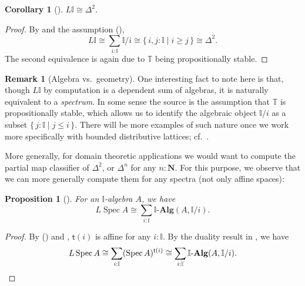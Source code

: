 \documentclass[a4paper,12pt]{amsart}
\newtheorem{corollary}[theorem]{Corollary}
\newtheorem{proposition}[theorem]{Proposition}
\theoremstyle{definition}
\newtheorem{remark}[theorem]{Remark}
\newtheorem*{axiom}{Axiom}
\newcommand{\mb}[1]{\mathbf{#1}}
\newcommand{\mbb}[1]{\mathbb{#1}}
\newcommand{\T}{\mbb T}
\newcommand{\I}{\mbb I}
\newcommand{\ms}[1]{\mathsf{#1}}
\newcommand{\alg}{\text{-}\mb{Alg}}
\newcommand{\scomp}[2]{\{\,#1\mid#2\,\}}
\newcommand{\N}{\mb N}
\newcommand{\spec}{\operatorname{Spec}}
\newcommand\istsym{\ms{t}}
\newcommand\ist[1]{\istsym(#1)}
\begin{document}
\begin{corollary}[\AxiomSQCI]
  $L \I \cong \Delta^2$.
\end{corollary}
\begin{proof}
  By  and the assumption (\AxiomSQCI),
  \[ L\I \cong \sum_{i:\I}\I/i \cong \scomp{i,j : \I}{i \ge j} \cong \Delta^2\text{.} \]
  The second equivalence is again due to $\T$ being propositionally stable.
\end{proof}

\begin{remark}[Algebra vs.\ geometry]\label{rem:alggeoI}
  One interesting fact to note here is that, though $L\I$ by computation is a dependent sum of algebras, it is naturally equivalent to a \emph{spectrum}. In some sense the source is the assumption that $\T$ is propositionally stable, which allows us to identify the algebraic object $\I/i$ as a subset $\scomp{j : \I}{j \le i}$. There will be more examples of such nature once we work more specifically with bounded distributive lattices; cf.\ .
\end{remark}

More generally, for domain theoretic applications we would want to compute the partial map classifier of $\Delta^2$, or $\Delta^n$ for any $n:\N$. For this purpose, we observe that we can more generally compute them for any spectra (not only affine spaces):

\begin{proposition}[\AxiomSQCI]\label{prop:liftofaffine}
  For an $\I$-algebra $A$, we have
  \[ L\spec A \cong \sum_{i:\I}\I\alg(A,\I/i)\text{.} \]
\end{proposition}
\begin{proof}
  By (\AxiomSQCI) and , $\ist{i}$ is affine for any $i:\I$. By the duality result in , we have
  \[ L\spec A \cong \sum_{i:\I}(\spec A)^{\ist{i}}\cong \sum_{i:\I}\I\alg(A,\I/i). \qedhere \]
\end{proof}



\end{document}
